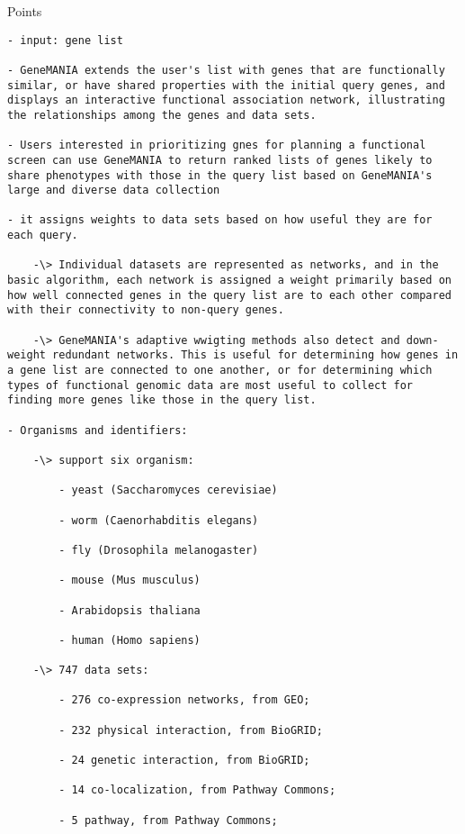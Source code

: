 \documentclass[
]{book}
\begin{document}
Points

\begin{verbatim}
- input: gene list

- GeneMANIA extends the user's list with genes that are functionally similar, or have shared properties with the initial query genes, and displays an interactive functional association network, illustrating the relationships among the genes and data sets.

- Users interested in prioritizing gnes for planning a functional screen can use GeneMANIA to return ranked lists of genes likely to share phenotypes with those in the query list based on GeneMANIA's large and diverse data collection

- it assigns weights to data sets based on how useful they are for each query.

    -\> Individual datasets are represented as networks, and in the basic algorithm, each network is assigned a weight primarily based on how well connected genes in the query list are to each other compared with their connectivity to non-query genes.

    -\> GeneMANIA's adaptive wwigting methods also detect and down-weight redundant networks. This is useful for determining how genes in a gene list are connected to one another, or for determining which types of functional genomic data are most useful to collect for finding more genes like those in the query list.

- Organisms and identifiers:

    -\> support six organism:

        - yeast (Saccharomyces cerevisiae)

        - worm (Caenorhabditis elegans)

        - fly (Drosophila melanogaster)

        - mouse (Mus musculus)

        - Arabidopsis thaliana

        - human (Homo sapiens)

    -\> 747 data sets:

        - 276 co-expression networks, from GEO;

        - 232 physical interaction, from BioGRID;

        - 24 genetic interaction, from BioGRID;

        - 14 co-localization, from Pathway Commons;

        - 5 pathway, from Pathway Commons;


\end{verbatim}
\end{document}
